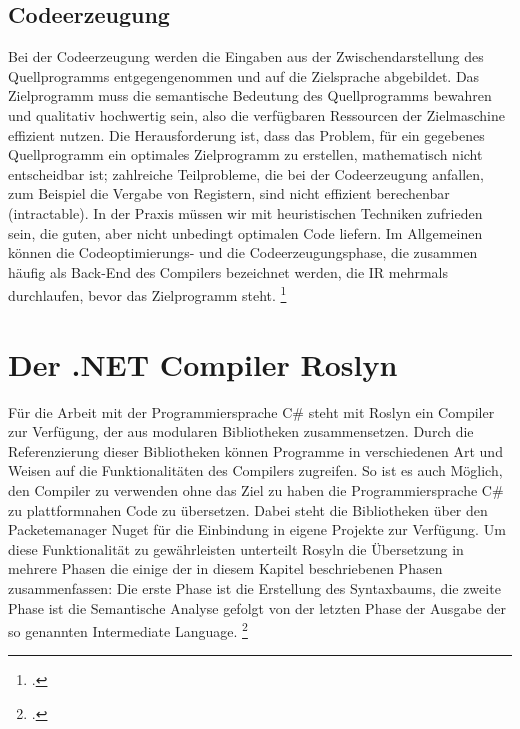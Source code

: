 \subsection{Codeerzeugung}
Bei der Codeerzeugung werden die Eingaben aus der Zwischendarstellung des Quellprogramms entgegengenommen und auf die Zielsprache abgebildet. Das Zielprogramm  muss die semantische Bedeutung des Quellprogramms bewahren und qualitativ hochwertig sein, also die verfügbaren Ressourcen der Zielmaschine effizient nutzen.  Die Herausforderung ist, dass das Problem, für ein gegebenes Quellprogramm ein optimales Zielprogramm zu erstellen, mathematisch nicht entscheidbar ist; zahlreiche  Teilprobleme, die bei der Codeerzeugung anfallen, zum Beispiel die Vergabe von Registern, sind nicht effizient berechenbar (intractable). In der Praxis müssen wir mit heuristischen Techniken zufrieden sein, die guten, aber nicht unbedingt optimalen Code liefern.  Im Allgemeinen können die  Codeoptimierungs- und die Codeerzeugungsphase, die zusammen häufig als Back-End  des Compilers bezeichnet werden, die IR mehrmals durchlaufen, bevor das Zielprogramm steht. \footcite[Vgl.][S. 618f]{Ullmann2008}

\section{Der .NET Compiler Roslyn}
Für die Arbeit mit der Programmiersprache C\# steht mit Roslyn ein Compiler zur Verfügung, der aus modularen Bibliotheken zusammensetzen. Durch die Referenzierung dieser Bibliotheken können Programme in verschiedenen Art und Weisen auf die Funktionalitäten des Compilers zugreifen.  So ist es auch Möglich, den Compiler zu verwenden ohne das Ziel zu haben die Programmiersprache C\# zu plattformnahen Code zu übersetzen.  Dabei steht die Bibliotheken über den Packetemanager Nuget für die Einbindung in eigene Projekte zur Verfügung.  Um diese Funktionalität zu gewährleisten unterteilt Rosyln die Übersetzung in mehrere Phasen die einige der in diesem Kapitel beschriebenen Phasen zusammenfassen: Die erste Phase ist die Erstellung des Syntaxbaums, die zweite Phase ist die Semantische Analyse gefolgt von der letzten Phase der Ausgabe der so genannten Intermediate Language. \footcite[Vgl.][S. 1017]{Albahari2020}



